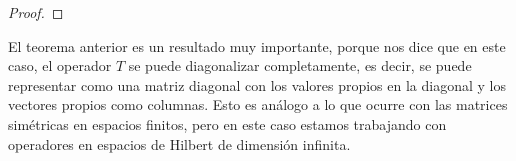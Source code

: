 \begin{teo}
\begin{proof}









\end{proof}
\end{teo}

\begin{observacion}
    El teorema anterior es un resultado muy importante, porque nos dice que en este caso, el operador $T$ se puede diagonalizar completamente, es decir, se puede representar como una matriz diagonal con los valores propios en la diagonal y los vectores propios como columnas. Esto es análogo a lo que ocurre con las matrices simétricas en espacios finitos, pero en este caso estamos trabajando con operadores en espacios de Hilbert de dimensión infinita.
\end{observacion}

